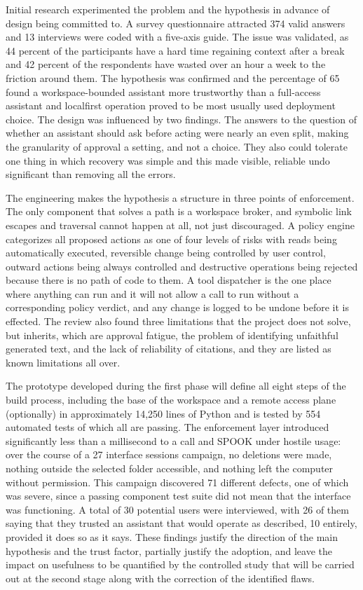 \documentclass{FastFyp}
\begin{document}
Initial research experimented the problem and the hypothesis in advance of design being committed to. A survey questionnaire attracted 374 valid answers and 13 interviews were coded with a five-axis guide. The issue was validated, as 44 percent of the participants have a hard time regaining context after a break and 42 percent of the respondents have wasted over an hour a week to the friction around them. The hypothesis was confirmed and the percentage of 65 found a workspace-bounded assistant more trustworthy than a full-access assistant and localfirst operation proved to be most usually used deployment choice. The design was influenced by two findings. The answers to the question of whether an assistant should ask before acting were nearly an even split, making the granularity of approval a setting, and not a choice. They also could tolerate one thing in which recovery was simple and this made visible, reliable undo significant than removing all the errors.

The engineering makes the hypothesis a structure in three points of enforcement. The only component that solves a path is a workspace broker, and symbolic link escapes and traversal cannot happen at all, not just discouraged. A policy engine categorizes all proposed actions as one of four levels of risks with reads being automatically executed, reversible change being controlled by user control, outward actions being always controlled and destructive operations being rejected because there is no path of code to them. A tool dispatcher is the one place where anything can run and it will not allow a call to run without a corresponding policy verdict, and any change is logged to be undone before it is effected. The review also found three limitations that the project does not solve, but inherits, which are approval fatigue, the problem of identifying unfaithful generated text, and the lack of reliability of citations, and they are listed as known limitations all over.

The prototype developed during the first phase will define all eight steps of the build process, including the base of the workspace and a remote access plane (optionally) in approximately 14,250 lines of Python and is tested by 554 automated tests of which all are passing. The enforcement layer introduced significantly less than a millisecond to a call and SPOOK under hostile usage: over the course of a 27 interface sessions campaign, no deletions were made, nothing outside the selected folder accessible, and nothing left the computer without permission. This campaign discovered 71 different defects, one of which was severe, since a passing component test suite did not mean that the interface was functioning. A total of 30 potential users were interviewed, with 26 of them saying that they trusted an assistant that would operate as described, 10 entirely, provided it does so as it says. These findings justify the direction of the main hypothesis and the trust factor, partially justify the adoption, and leave the impact on usefulness to be quantified by the controlled study that will be carried out at the second stage along with the correction of the identified flaws.
\end{document}
